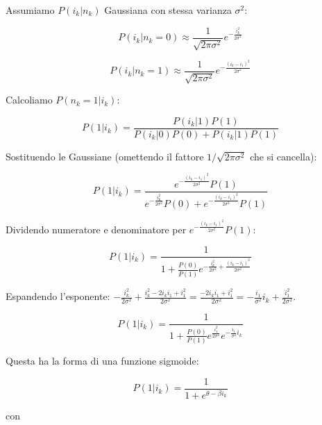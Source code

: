 Assumiamo $P(i_k|n_k)$ Gaussiana con stessa varianza $\sigma^2$:

\begin{equation*} 
P(i_k | n_k=0) \approx \frac{1}{\sqrt{2\pi\sigma^2}} e^{-\frac{i_k^2}{2\sigma^2}}
\end{equation*}

\begin{equation*} 
P(i_k | n_k=1) \approx \frac{1}{\sqrt{2\pi\sigma^2}} e^{-\frac{(i_k - i_1)^2}{2\sigma^2}}
\end{equation*}

Calcoliamo $P(n_k=1 | i_k)$:

\begin{equation} \label{eq:ch16_6}
P(1 | i_k) = \frac{P(i_k | 1) P(1)}{P(i_k | 0) P(0) + P(i_k | 1) P(1)}
\end{equation}

Sostituendo le Gaussiane (omettendo il fattore $1/\sqrt{2\pi\sigma^2}$ che si cancella):

\begin{equation} \label{eq:ch16_7}
P(1 | i_k) = \frac{e^{-\frac{(i_k - i_1)^2}{2\sigma^2}} P(1)}{e^{-\frac{i_k^2}{2\sigma^2}} P(0) + e^{-\frac{(i_k - i_1)^2}{2\sigma^2}} P(1)}
\end{equation}

Dividendo numeratore e denominatore per $e^{-\frac{(i_k - i_1)^2}{2\sigma^2}} P(1)$:

\begin{equation} \label{eq:ch16_8}
P(1 | i_k) = \frac{1}{ 1 + \frac{P(0)}{P(1)} e^{ -\frac{i_k^2}{2\sigma^2} +\frac{(i_k - i_1)^2}{2\sigma^2} } } 
\end{equation}

Espandendo l'esponente: $-\frac{i_k^2}{2\sigma^2} + \frac{i_k^2 - 2i_k i_1 + i_1^2}{2\sigma^2} = \frac{-2i_k i_1 + i_1^2}{2\sigma^2} = -\frac{i_1}{\sigma^2} i_k + \frac{i_1^2}{2\sigma^2}$.

\begin{equation} \label{eq:ch16_9}
P(1 | i_k) = \frac{1}{1 + \frac{P(0)}{P(1)} e^{\frac{i_1^2}{2\sigma^2}} e^{-\frac{i_1}{\sigma^2} i_k}}
\end{equation}

Questa ha la forma di una funzione sigmoide:

\begin{equation} \label{eq:ch16_10}
P(1 | i_k) = \frac{1}{1 + e^{\theta - \beta i_k}}
\end{equation}

con

